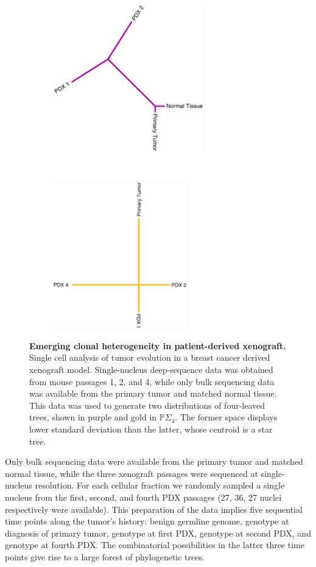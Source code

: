 \documentclass[a4paper,11pt]{article}
\begin{document}
\begin{figure}
    \begin{subfigure}{0.5\linewidth}
    \centering
    \includegraphics[height=2.5in]{../figures/xenograft_tree_purple.pdf}
    \end{subfigure}
    ~
    \begin{subfigure}{0.5\linewidth}
    \centering
    \includegraphics[height=2.5in]{../figures/xenograft_tree_gold.pdf}
    \end{subfigure}

    \caption{{\bf Emerging clonal heterogeneity in patient-derived xenograft.} Single cell analysis of tumor evolution in a breast cancer derived xenograft model. Single-nucleus deep-sequence data was obtained from mouse passages 1, 2, and 4, while only bulk sequencing data was available from the primary tumor and matched normal tissue. This data was used to generate two distributions of four-leaved trees, shown in purple and gold in $\mathbb{P}\Sigma_4 $. The former space displays lower standard deviation than the latter, whose centroid is a star tree.}
    \label{fig:xenograft}
\end{figure} 

Only bulk sequencing data were available from the primary tumor and matched normal tissue, while the three xenograft passages were sequenced at single-nucleus resolution.
For each cellular fraction we randomly sampled a single nucleus from the first, second, and fourth PDX passages (27, 36, 27 nuclei respectively were available).
This preparation of the data implies five sequential time points along the tumor's history: benign germline genome, genotype at diagnosis of primary tumor, genotype at first PDX, genotype at second PDX, and genotype at fourth PDX.
The combinatorial possibilities in the latter three time points give rise to a large forest of phylogenetic trees.
\end{document}
